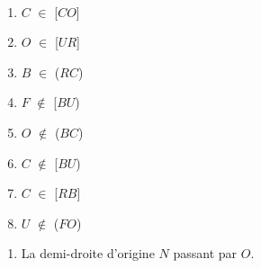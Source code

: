 \documentclass[a4paper,12pt]{report}
\begin{document}
\begin{Correction}
\begin{EXO}{}{}
\begin{enumerate}[]
\begin{tikzpicture}[baseline]
\end{tikzpicture}\\
\end{enumerate}

\end{EXO}

\begin{EXO}{}{}
\begin{multicols}{4}

\begin{enumerate}[]
\item \begin{minipage}[t]{\linewidth}$C$ $\in$ [$CO$]\end{minipage}
\item \begin{minipage}[t]{\linewidth}$O$ $\in$ [$UR$]\end{minipage}
\item \begin{minipage}[t]{\linewidth}$B$ $\in$ ($RC$)\end{minipage}
\item \begin{minipage}[t]{\linewidth}$F$ $\notin$ [$BU$)\end{minipage}
\item \begin{minipage}[t]{\linewidth}$O$ $\notin$ ($BC$)\end{minipage}
\item \begin{minipage}[t]{\linewidth}$C$ $\notin$ [$BU$)\end{minipage}
\item \begin{minipage}[t]{\linewidth}$C$ $\in$ [$RB$]\end{minipage}
\item \begin{minipage}[t]{\linewidth}$U$ $\notin$ ($FO$)\end{minipage}
\end{enumerate}
\end{multicols}

\end{EXO}

\begin{EXO}{}{}

\begin{enumerate}[]
\item La demi-droite d'origine $N$ passant par $O$.\\\begin{tikzpicture}[baseline,scale = 0.4]


\end{tikzpicture}
\end{enumerate}
\end{EXO}
\end{Correction}
\end{document}
